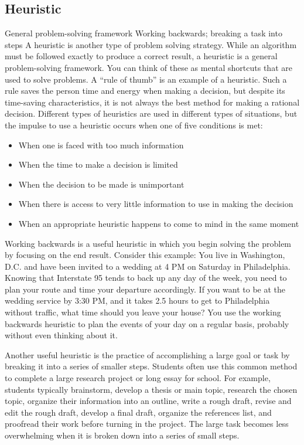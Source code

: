 \documentclass[oneside,a4paper,12pt]{book}
\begin{document}
\subsection{Heuristic}
General problem-solving framework	Working backwards; breaking a task into steps
A heuristic is another type of problem solving strategy. While an algorithm must be followed exactly to produce a correct result, a heuristic is a general problem-solving framework. You can think of these as mental shortcuts that are used to solve problems. A “rule of thumb” is an example of a heuristic. Such a rule saves the person time and energy when making a decision, but despite its time-saving characteristics, it is not always the best method for making a rational decision. Different types of heuristics are used in different types of situations, but the impulse to use a heuristic occurs when one of five conditions is met:
\begin{itemize}
\item When one is faced with too much information
\item When the time to make a decision is limited
\item When the decision to be made is unimportant
\item When there is access to very little information to use in making the decision
\item When an appropriate heuristic happens to come to mind in the same moment
\end{itemize}
Working backwards is a useful heuristic in which you begin solving the problem by focusing on the end result. Consider this example: You live in Washington, D.C. and have been invited to a wedding at 4 PM on Saturday in Philadelphia. Knowing that Interstate 95 tends to back up any day of the week, you need to plan your route and time your departure accordingly. If you want to be at the wedding service by 3:30 PM, and it takes 2.5 hours to get to Philadelphia without traffic, what time should you leave your house? You use the working backwards heuristic to plan the events of your day on a regular basis, probably without even thinking about it.

Another useful heuristic is the practice of accomplishing a large goal or task by breaking it into a series of smaller steps. Students often use this common method to complete a large research project or long essay for school. For example, students typically brainstorm, develop a thesis or main topic, research the chosen topic, organize their information into an outline, write a rough draft, revise and edit the rough draft, develop a final draft, organize the references list, and proofread their work before turning in the project. The large task becomes less overwhelming when it is broken down into a series of small steps.
\end{document}
